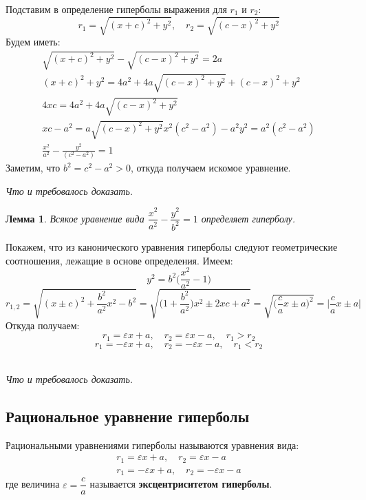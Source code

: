 \documentclass[a4paper,12pt,oneside]{extbook}
\newcommand{\newpar}{$ $\par\nobreak\ignorespaces}
\theoremstyle{numbered}
\theoremstyle{unnumbered}
\theoremstyle{named}
\theoremstyle{unnumbered}
\theoremstyle{named}
\newtheorem{lemma}{Лемма}[section]
\theoremstyle{named}
\theoremstyle{named}
\renewenvironment{proof}[1][]{\breakenv[Доказательство]{\if\relax\detokenize{#1}\relax\else\;\fi}{\textbf{#1}}}{\smallskip\newpar \hfill\textit{Что и требовалось доказать.}}
\begin{document}
\begin{proof}
    Подставим в определение гиперболы выражения для \(r_1\) и \(r_2\):
    \[
        r_1 = \sqrt{{(x + c)}^2 + y^2}, \quad r_2 = \sqrt{{(c - x)}^2 + y^2}
    \]
    Будем иметь:
    \begin{gather*}
        \sqrt{{(x + c)}^2 + y^2} - \sqrt{{(c - x)}^2 + y^2} = 2a \\
        {(x + c)}^2 + y^2 = 4a^2 + 4a \sqrt{{(c - x)}^2 + y^2} + {(c - x)}^2 + y^2 \\
        4xc = 4a^2 + 4a \sqrt{{(c - x)}^2 + y^2} \\
        xc - a^2 = a \sqrt{{(c - x)}^2 + y^2}
        x^2 (c^2 - a^2) - a^2 y^2 = a^2 (c^2 - a^2) \\
        \frac{x^2}{a^2} - \frac{y^2}{(c^2 - a^2)} = 1
    \end{gather*}
    Заметим, что \(b^2 = c^2 - a^2 > 0\), откуда получаем искомое уравнение.
\end{proof}

\begin{lemma}
    Всякое уравнение вида \(\dfrac{x^2}{a^2} - \dfrac{y^2}{b^2} = 1\) определяет гиперболу.
\end{lemma}

\begin{proof}
    Покажем, что из канонического уравнения гиперболы следуют геометрические соотношения, лежащие в основе определения. Имеем:
    \[
        y^2 = b^2 \Big(\frac{x^2}{a^2} - 1\Big)
    \]
    \[
        r_{1, 2} = \sqrt{{(x \pm c)}^2 + \frac{b^2}{a^2} x^2 - b^2} = \sqrt{\Big(1 + \frac{b^2}{a^2}\Big) x^2 \pm 2xc + a^2} = \sqrt{\Big(\frac{c}{a}x \pm a\Big)^2} = \Big| \frac{c}{a}x \pm a \Big|
    \]
    Откуда получаем:
    \[
        r_1 = \varepsilon x + a, \quad r_2 = \varepsilon x - a, \quad r_1 > r_2
    \]
    \[
        r_1 = -\varepsilon x + a, \quad r_2 = -\varepsilon x - a, \quad r_1 < r_2
    \]
\end{proof}

\subsection{Рациональное уравнение гиперболы}%
\label{sub:Рациональное уравнение гиперболы}

\begin{siderules}
    Рациональными уравнениями гиперболы называются уравнения вида:
    \begin{gather*}
        r_1 = \varepsilon x + a, \quad r_2 = \varepsilon x - a \\
        r_1 = -\varepsilon x + a, \quad r_2 = -\varepsilon x - a
    \end{gather*}
    где величина \(\varepsilon = \dfrac{c}{a}\) называется \textbf{эксцентриситетом гиперболы}.
\end{siderules}
\end{document}
